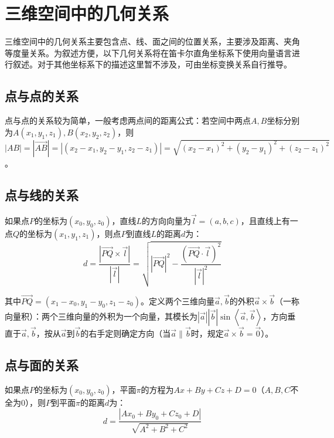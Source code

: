 \section{三维空间中的几何关系}
三维空间中的几何关系主要包含点、线、面之间的位置关系，主要涉及距离、夹角等度量关系。为叙述方便，以下几何关系将在笛卡尔直角坐标系下使用向量语言进行叙述。对于其他坐标系下的描述这里暂不涉及，可由坐标变换关系自行推导。

\subsection{点与点的关系}
点与点的关系较为简单，一般考虑两点间的距离公式：若空间中两点\(A , B\)坐标分别为\(A \left( x_{1} , y_{1} , z_{1} \right) , B \left( x_{2} , y_{2} , z_{2} \right)\)，则\(\left| A B \right| = \left| \vec{A B} \right| = \left| \left( x_{2} - x_{1} , y_{2} - y_{1} , z_{2} - z_{1} \right) \right| = \sqrt{{\left( x_{2} - x_{1} \right)}^{2} + {\left( y_{2} - y_{1} \right)}^{2} + {\left( z_{2} - z_{1} \right)}^{2}}\)。

\subsection{点与线的关系}
如果点\(P\)的坐标为\(\left( x_{0} , y_{0} , z_{0} \right)\)，直线\(L\)的方向向量为\(\vec{l} = \left( a , b , c \right)\)，且直线上有一点\(Q\)的坐标为\(\left( x_{1} , y_{1} , z_{1} \right)\)，则点\(P\)到直线\(L\)的距离\(d\)为：
\begin{equation}
    d = \frac{\left| \vec{P Q} \times \vec{l} \right|}{\left| \vec{l} \right|}
    = \sqrt{\left| \vec{P Q} \right|^{2} - \frac{\left( \vec{P Q} \cdot \vec{l} \right)^{2}}{\left| \vec{l} \right|^{2}}}
\end{equation}

其中\(\vec{P Q} = \left( x_{1} - x_{0} , y_{1} - y_{0} , z_{1} - z_{0} \right)\)。定义两个三维向量\(\vec{a} , \vec{b}\)的外积\(\vec{a} \times \vec{b}\)（一称向量积）：两个三维向量的外积为一个向量，其模长为\(\left| \vec{a} \right| \left| \vec{b} \right| \sin \left\langle \vec{a} , \vec{b} \right\rangle\)，方向垂直于\(\vec{a} , \vec{b}\)，按从\(\vec{a}\)到\(\vec{b}\)的右手定则确定方向（当\(\vec{a} \parallel \vec{b}\)时，规定\(\vec{a} \times \vec{b} = \vec{0}\)）。

\subsection{点与面的关系}
如果点\(P\)的坐标为\(\left( x_{0} , y_{0} , z_{0} \right)\)，平面\(\pi\)的方程为\(A x + B y + C z + D = 0\)（\(A , B , C\)不全为0），则\(P\)到平面\(\pi\)的距离\(d\)为：
\begin{equation}
    d = \frac{\left| A x_{0} + B y_{0} + C z_{0} + D \right|}{\sqrt{A^{2} + B^{2} + C^{2}}}
\end{equation}

